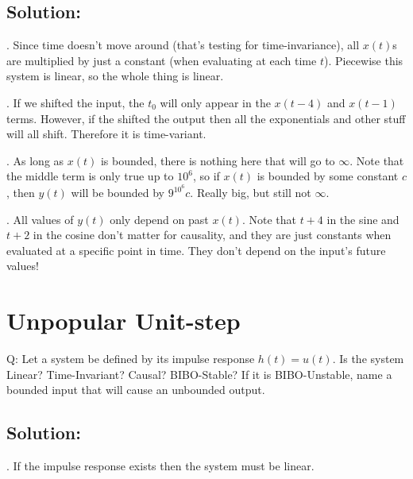 \documentclass{article}
\begin{document}
\subsection{Solution:}

. Since time doesn't move around (that's testing for time-invariance), all $x(t)$s are multiplied by just a constant (when evaluating at each time $t$). Piecewise this system is linear, so the whole thing is linear.

. If we shifted the input, the $t_0$ will only appear in the $x(t-4)$ and $x(t-1)$ terms. However, if the shifted the output then all the exponentials and other stuff will all shift. Therefore it is time-variant.

. As long as $x(t)$ is bounded, there is nothing here that will go to $\infty$. Note that the middle term is only true up to $10^6$, so if $x(t)$ is bounded by some constant $c$, then $y(t)$ will be bounded by $9^{10^6}c$. Really big, but still not $\infty$.

. All values of $y(t)$ only depend on past $x(t)$. Note that $t+4$ in the sine and $t+2$ in the cosine don't matter for causality, and they are just constants when evaluated at a specific point in time. They don't depend on the input's future values!



\newpage

\section{Unpopular Unit-step}

Q: Let a system be defined by its impulse response $h(t) = u(t)$. Is the system Linear? Time-Invariant? Causal? BIBO-Stable? If it is BIBO-Unstable, name a bounded input that will cause an unbounded output.

\subsection{Solution:}

. If the impulse response exists then the system must be linear.
\end{document}
